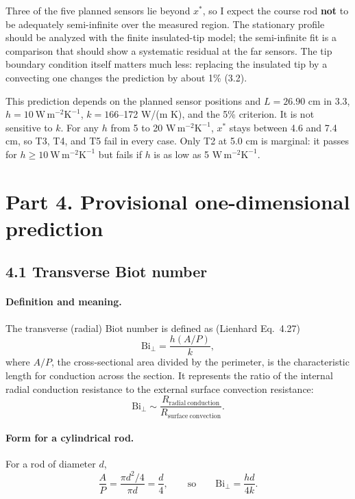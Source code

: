 \documentclass[reprint, amsmath, amssymb, aps, prl]{revtex4-2}
\newcommand{\Biperp}{\mathrm{Bi}_\perp}
\newcommand{\WmmK}{\mathrm{W\,m^{-2}K^{-1}}}
\begin{document}
Three of the five planned sensors lie beyond $x^{\ast}$, so I expect the course rod
\textbf{not} to be adequately semi-infinite over the measured region. The stationary
profile should be analyzed with the finite insulated-tip model; the semi-infinite fit is a
comparison that should show a systematic residual at the far sensors. The tip boundary
condition itself matters much less: replacing the insulated tip by a convecting one
changes the prediction by about 1\% (3.2).

This prediction depends on the planned sensor positions and $L=26.90$ cm in 3.3,
$h=10~\WmmK$, $k=166$--172 W/(m K), and the 5\% criterion. It is not sensitive to $k$.
For any $h$ from 5 to 20 $\WmmK$, $x^{\ast}$ stays between 4.6 and 7.4 cm, so T3, T4, and
T5 fail in every case. Only T2 at 5.0 cm is marginal: it passes for $h\ge10~\WmmK$ but
fails if $h$ is as low as 5 $\WmmK$.

\section*{Part 4. Provisional one-dimensional prediction}

\subsection*{4.1 Transverse Biot number}

\paragraph*{Definition and meaning.}
The transverse (radial) Biot number is defined as (Lienhard Eq.~4.27)
\begin{equation*}
\Biperp=\frac{h(A/P)}{k},
\end{equation*}
where $A/P$, the cross-sectional area divided by the perimeter, is the characteristic
length for conduction across the section. It represents the ratio of the internal radial
conduction resistance to the external surface convection resistance:
\begin{equation*}
\Biperp\sim\frac{R_{\mathrm{radial\ conduction}}}{R_{\mathrm{surface\ convection}}}.
\end{equation*}

\paragraph*{Form for a cylindrical rod.}
For a rod of diameter $d$,
\begin{equation*}
\frac{A}{P}=\frac{\pi d^2/4}{\pi d}=\frac{d}{4},
\qquad\text{so}\qquad
\boxed{\Biperp=\frac{hd}{4k}}.
\end{equation*}
\end{document}
